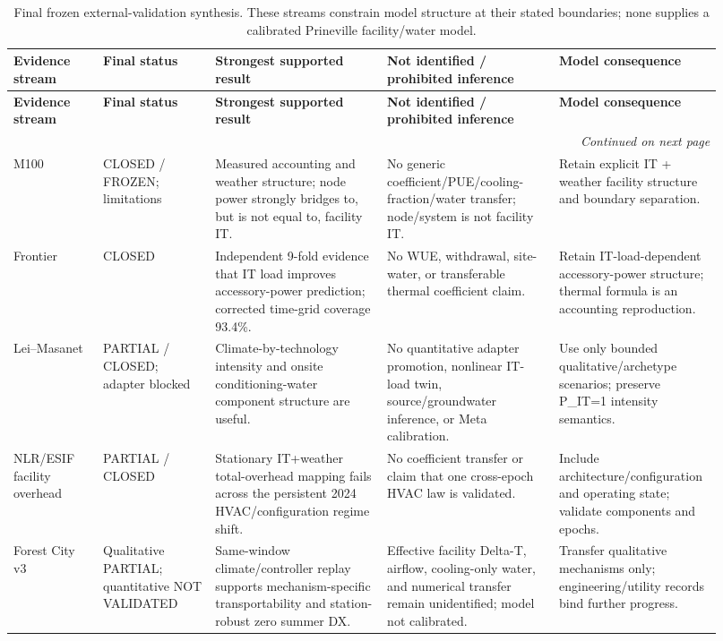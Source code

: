 \begingroup
\scriptsize
\setlength{\tabcolsep}{3pt}
\setlength{\emergencystretch}{3em}
\raggedright
\sloppy
\begin{longtable}{@{}p{0.120\linewidth}p{0.150\linewidth}p{0.230\linewidth}p{0.230\linewidth}p{0.190\linewidth}@{}}
\caption{Final frozen external-validation synthesis. These streams constrain model structure at their stated boundaries; none supplies a calibrated Prineville facility/water model.}\\
\toprule
\textbf{Evidence stream} & \textbf{Final status} & \textbf{Strongest supported result} & \textbf{Not identified / prohibited inference} & \textbf{Model consequence} \\
\midrule
\endfirsthead
\toprule
\textbf{Evidence stream} & \textbf{Final status} & \textbf{Strongest supported result} & \textbf{Not identified / prohibited inference} & \textbf{Model consequence} \\
\midrule
\endhead
\midrule
\multicolumn{5}{r}{\emph{Continued on next page}}\\
\endfoot
\bottomrule
\endlastfoot
M100 & CLOSED / FROZEN; limitations & Measured accounting and weather structure; node power strongly bridges to, but is not equal to, facility IT. & No generic coefficient/PUE/cooling-fraction/water transfer; node/system is not facility IT. & Retain explicit IT + weather facility structure and boundary separation. \\
Frontier & CLOSED & Independent 9-fold evidence that IT load improves accessory-power prediction; corrected time-grid coverage 93.4\%. & No WUE, withdrawal, site-water, or transferable thermal coefficient claim. & Retain IT-load-dependent accessory-power structure; thermal formula is an accounting reproduction. \\
Lei--Masanet & PARTIAL / CLOSED; adapter blocked & Climate-by-technology intensity and onsite conditioning-water component structure are useful. & No quantitative adapter promotion, nonlinear IT-load twin, source/groundwater inference, or Meta calibration. & Use only bounded qualitative/archetype scenarios; preserve P\_IT=1 intensity semantics. \\
NLR/ESIF facility overhead & PARTIAL / CLOSED & Stationary IT+weather total-overhead mapping fails across the persistent 2024 HVAC/configuration regime shift. & No coefficient transfer or claim that one cross-epoch HVAC law is validated. & Include architecture/configuration and operating state; validate components and epochs. \\
Forest City v3 & Qualitative PARTIAL; quantitative NOT VALIDATED & Same-window climate/controller replay supports mechanism-specific transportability and station-robust zero summer DX. & Effective facility Delta-T, airflow, cooling-only water, and numerical transfer remain unidentified; model not calibrated. & Transfer qualitative mechanisms only; engineering/utility records bind further progress. \\

\end{longtable}
